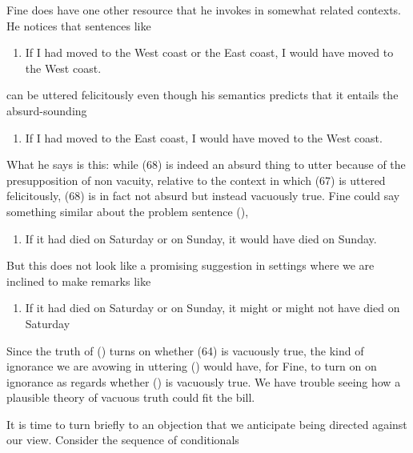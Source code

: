 Fine does have one other resource that he invokes in somewhat related
contexts. He notices that sentences like

\begin{enumerate}
\def\labelenumi{(\arabic{enumi})}
\setcounter{enumi}{65}
\itemsep1pt\parskip0pt
\item
  If I had moved to the West coast or the East coast, I would have moved
  to the West coast.
\end{enumerate}

can be uttered felicitously even though his semantics predicts that it
entails the absurd-sounding

\begin{enumerate}
\def\labelenumi{(\arabic{enumi})}
\setcounter{enumi}{66}
\itemsep1pt\parskip0pt
\item
  If I had moved to the East coast, I would have moved to the West
  coast.
\end{enumerate}

What he says is this: while (68) is indeed an absurd thing to utter
because of the presupposition of non vacuity, relative to the context in
which (67) is uttered felicitously, (68) is in fact not absurd but
instead vacuously true. Fine could say something similar about the
problem sentence (),

\begin{enumerate}
\def\labelenumi{(\arabic{enumi})}
\setcounter{enumi}{67}
\itemsep1pt\parskip0pt
\item
  If it had died on Saturday or on Sunday, it would have died on Sunday.
\end{enumerate}

But this does not look like a promising suggestion in settings where we
are inclined to make remarks like

\begin{enumerate}
\def\labelenumi{(\arabic{enumi})}
\setcounter{enumi}{68}
\itemsep1pt\parskip0pt
\item
  If it had died on Saturday or on Sunday, it might or might not have
  died on Saturday
\end{enumerate}

Since the truth of () turns on whether (64) is vacuously true, the kind
of ignorance we are avowing in uttering () would have, for Fine, to turn
on on ignorance as regards whether () is vacuously true. We have trouble
seeing how a plausible theory of vacuous truth could fit the bill.

It is time to turn briefly to an objection that we anticipate being
directed against our view. Consider the sequence of conditionals

